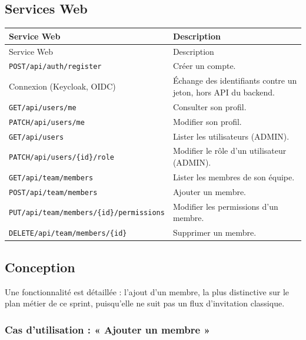 \subsection{Services Web}
{\setlength{\tabcolsep}{8pt}
\begin{longtable}{|p{5.8cm}|p{8.4cm}|}
\hline
Service Web & Description \\
\hline
\endfirsthead
\hline
Service Web & Description \\
\hline
\endhead
\endfoot
\hline
\endlastfoot
\texttt{POST\slash api\slash auth\slash register} & Créer un compte. \\ \hline
Connexion (Keycloak, OIDC) & Échange des identifiants contre un jeton, hors API du backend. \\ \hline
\texttt{GET\slash api\slash users\slash me} & Consulter son profil. \\ \hline
\texttt{PATCH\slash api\slash users\slash me} & Modifier son profil. \\ \hline
\texttt{GET\slash api\slash users} & Lister les utilisateurs (ADMIN). \\ \hline
\texttt{PATCH\slash api\slash users\slash\{id\}\slash role} & Modifier le rôle d'un utilisateur (ADMIN). \\ \hline
\texttt{GET\slash api\slash team\slash members} & Lister les membres de son équipe. \\ \hline
\texttt{POST\slash api\slash team\slash members} & Ajouter un membre. \\ \hline
\texttt{PUT\slash api\slash team\slash members\slash\{id\}\slash permissions} & Modifier les permissions d'un membre. \\ \hline
\texttt{DELETE\slash api\slash team\slash members\slash\{id\}} & Supprimer un membre. \\ \hline
\end{longtable}}

\subsection{Conception}

Une fonctionnalité est détaillée : l'ajout d'un membre, la plus distinctive sur le plan métier de ce sprint, puisqu'elle ne suit pas un flux d'invitation classique.

\needspace{0.45\textheight}
\subsubsection{Cas d'utilisation : « Ajouter un membre »}

